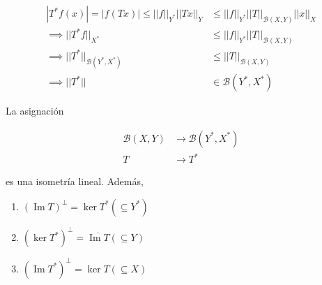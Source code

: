 \begin{align*}
   |T^*f(x)|=|f(Tx)|\leq ||f||_{Y^*}||Tx||_{Y}&\leq ||f||_{Y^*}||T||_{\mathcal{B}(X,Y)}||x||_X\\
   \implies ||T^*f||_{X^*}&\leq ||f||_{Y^*}||T||_{\mathcal{B}(X,Y)}\\
   \implies ||T^*||_{\mathcal{B}(Y^*,X^*)}&\leq ||T||_{\mathcal{B}(X,Y)}\\
   \implies ||T^*||&\in\mathcal{B}(Y^*,X^*)
\end{align*}

\begin{ftheorem}
   La asignación 

   \begin{align*}
       \mathcal{B}(X,Y)&\to \mathcal{B}(Y^*,X^*)\\
       T&\to T^*
   \end{align*}

   es una isometría lineal. Además,

   \begin{enumerate}[label=(\alph*)]
       \item $(\operatorname{Im} T)^\perp=\ker T^* (\subseteq Y^*)$
       \item $(\ker T^*)^\perp=\overline{\operatorname{Im}T} (\subseteq Y)$
       \item $(\operatorname{Im}T^*)^\perp=\ker T (\subseteq X)$
   \end{enumerate}
\end{ftheorem}

